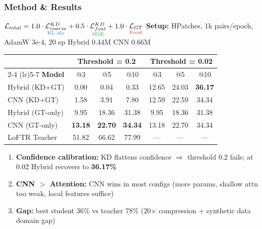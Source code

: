 \documentclass{beamer}
\begin{document}
\begin{frame}
\frametitle{Method \& Results}

\scriptsize
\vspace{-0.5em}
$\mathcal{L}_{total} =
  1.0 \cdot \underset{\textcolor{highlightblue}{\text{KL div}}}{\mathcal{L}_{coarse}^{KD}}
+ 0.5 \cdot \underset{\textcolor{highlightgreen}{\text{MSE}}}{\mathcal{L}_{feat}^{KD}}
+ 1.0 \cdot \underset{\textcolor{highlightred}{\text{Focal}}}{\mathcal{L}_{GT}}$
\hfill
\textbf{Setup:} HPatches, 1k pairs/epoch, AdamW 3e-4, 20 ep \hfill Hybrid 0.44M \quad CNN 0.66M

\vspace{0.4em}
\centering
\footnotesize
\begin{tabular}{l ccc ccc}
  \toprule
  & \multicolumn{3}{c}{\textbf{Threshold = 0.2}} & \multicolumn{3}{c}{\textbf{Threshold = 0.02}} \\
  \cmidrule(lr){2-4} \cmidrule(lr){5-7}
  \textbf{Model} & @3 & @5 & @10 & @3 & @5 & @10 \\
  \midrule
  Hybrid (KD+GT) & \textcolor{highlightred}{0.00} & \textcolor{highlightred}{0.04} & \textcolor{highlightred}{0.33}
    & 12.65 & 24.03 & \textcolor{highlightgreen}{\textbf{36.17}} \\
  CNN (KD+GT) & 1.58 & 3.91 & 7.80
    & 12.59 & 22.59 & 34.34 \\
  \midrule
  Hybrid (GT-only) & 9.95 & 18.36 & 31.38
    & 9.95 & 18.36 & 31.38 \\
  CNN (GT-only) & \textcolor{highlightgreen}{\textbf{13.18}} & \textcolor{highlightgreen}{\textbf{22.70}} & \textcolor{highlightgreen}{\textbf{34.34}}
    & 13.18 & 22.70 & 34.34 \\
  \midrule
  LoFTR Teacher & 51.82 & 66.62 & 77.99
    & — & — & — \\
  \bottomrule
\end{tabular}

\vspace{0.4em}
\raggedright
\scriptsize
\begin{enumerate}
  \item \textcolor{highlightblue}{\textbf{Confidence calibration:}} KD flattens confidence $\Rightarrow$
        threshold 0.2 fails; at 0.02 Hybrid recovers to \textbf{36.17\%}
  \item \textcolor{highlightgreen}{\textbf{CNN $>$ Attention:}} CNN wins in most configs
        (more params, shallow attn too weak, local features suffice)
  \item \textcolor{highlightred}{\textbf{Gap:}} best student 36\% vs teacher 78\%
        (20$\times$ compression + synthetic data domain gap)
\end{enumerate}
\end{frame}
\end{document}
